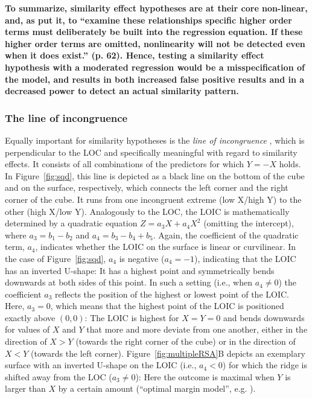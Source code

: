 \documentclass[jou,a4paper,draftfirst]{apa6}
\newcommand{\added}[1]{\textcolor{colour_added}{\bf{#1}}}
\begin{document}
\added{To summarize, similarity effect hypotheses are at their core non-linear, and, as \textcite{Aiken_West_1991} put it, to ``examine these relationships specific higher order terms must deliberately be built into the regression equation. If these higher order terms are omitted, nonlinearity will not be detected even when it does exist.'' (p. 62). Hence, testing a similarity effect hypothesis with a moderated regression would be a misspecification of the model, and results in both increased false positive results and in a decreased power to detect an actual similarity pattern.}

\subsubsection{The line of incongruence}
Equally important for similarity hypotheses is the \emph{line of incongruence} \parencite[LOIC,][]{edwards_relationship_2007}, which is perpendicular to the LOC and specifically meaningful with regard to similarity effects. It consists of all combinations of the predictors for which $Y = -X$ holds. In Figure~\ref{fig:sqd}, this line is depicted as a black line on the bottom of the cube and on the surface, respectively, which connects the left corner and the right corner of the cube. It runs from one incongruent extreme (low X/high Y) to the other (high X/low Y).
Analogously to the LOC, the LOIC is mathematically determined by a quadratic equation $Z = a_3X + a_4X^2$ (omitting the intercept), where $a_3 = b_1 - b_2$ and $a_4 = b_3 - b_4 + b_5$. Again, the coefficient of the quadratic term, $a_4$, indicates whether the LOIC on the surface is linear or curvilinear. In the case of Figure~\ref{fig:sqd}, $a_4$ is negative ($a_4 = -1$), indicating that the LOIC has an inverted U-shape: It has a highest point and symmetrically bends downwards at both sides of this point. In such a setting (i.e., when $a_4 \neq 0$) the coefficient $a_3$ reflects the position of the highest or lowest point of the LOIC. Here, $a_3 = 0$, which means that the highest point of the LOIC is positioned exactly above $(0,0)$: The LOIC is highest for $X = Y = 0$ and bends downwards for values of $X$ and $Y$ that more and more deviate from one another, either in the direction of $X > Y$ (towards the right corner of the cube) or in the direction of $X < Y$ (towards the left corner). Figure~\ref{fig:multipleRSA}B depicts an exemplary surface with an inverted U-shape on the LOIC (i.e., $a_4 < 0$) for which the ridge is shifted away from the LOC ($a_3 \neq 0$): Here the outcome is maximal when $Y$ is larger than $X$ by a certain amount (``optimal margin model'', e.g. ).
\end{document}
